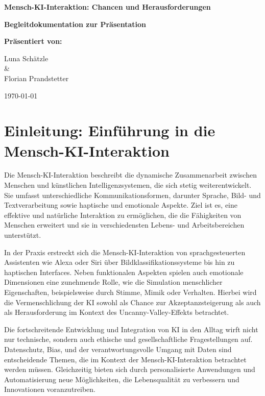 \documentclass[a4paper,12pt]{article}
\begin{document}
\begin{titlepage}
    \centering
    \vspace*{1.5cm}
    \Huge\textbf{Mensch-KI-Interaktion: Chancen und Herausforderungen}

    \vspace{1cm}
    \Large\textbf{Begleitdokumentation zur Präsentation}

    \vspace{2cm}
    \textbf{Präsentiert von:}

    \vspace{0.5cm}
    \large
    Luna Schätzle \\ \& \\   Florian Prandstetter

    \vfill
    \large \today
\end{titlepage}

\tableofcontents
\newpage

\section{Einleitung: Einführung in die Mensch-KI-Interaktion}

Die Mensch-KI-Interaktion beschreibt die dynamische Zusammenarbeit zwischen Menschen und künstlichen Intelligenzsystemen, die sich stetig weiterentwickelt. Sie umfasst unterschiedliche Kommunikationsformen, darunter Sprache, Bild- und Textverarbeitung sowie haptische und emotionale Aspekte. Ziel ist es, eine effektive und natürliche Interaktion zu ermöglichen, die die Fähigkeiten von Menschen erweitert und sie in verschiedensten Lebens- und Arbeitsbereichen unterstützt.

In der Praxis erstreckt sich die Mensch-KI-Interaktion von sprachgesteuerten Assistenten wie Alexa oder Siri über Bildklassifikationssysteme bis hin zu haptischen Interfaces. Neben funktionalen Aspekten spielen auch emotionale Dimensionen eine zunehmende Rolle, wie die Simulation menschlicher Eigenschaften, beispielsweise durch Stimme, Mimik oder Verhalten. Hierbei wird die Vermenschlichung der KI sowohl als Chance zur Akzeptanzsteigerung als auch als Herausforderung im Kontext des Uncanny-Valley-Effekts betrachtet.

Die fortschreitende Entwicklung und Integration von KI in den Alltag wirft nicht nur technische, sondern auch ethische und gesellschaftliche Fragestellungen auf. Datenschutz, Bias, und der verantwortungsvolle Umgang mit Daten sind entscheidende Themen, die im Kontext der Mensch-KI-Interaktion betrachtet werden müssen. Gleichzeitig bieten sich durch personalisierte Anwendungen und Automatisierung neue Möglichkeiten, die Lebensqualität zu verbessern und Innovationen voranzutreiben.
\end{document}
